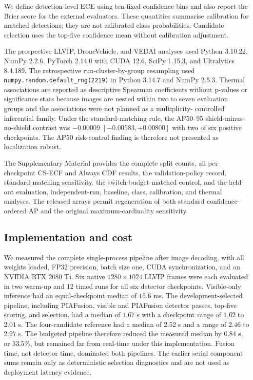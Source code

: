 \documentclass[preprint,11pt]{elsarticle}
\begin{document}
We define detection-level ECE using ten fixed confidence bins and also report
the Brier score for the external evaluators. These quantities summarise
calibration for matched detections; they are not calibrated class
probabilities. Candidate selection uses the top-five confidence mean without
calibration adjustment.

The prospective LLVIP, DroneVehicle, and VEDAI analyses used Python 3.10.22,
NumPy 2.2.6, PyTorch
2.14.0 with CUDA 12.6, SciPy 1.15.3, and Ultralytics 8.4.189. The retrospective
run-cluster-by-group resampling used
\texttt{numpy.random.default\_rng(2219)} in Python 3.14.7 and NumPy 2.5.3.
Thermal associations are reported as descriptive Spearman coefficients without
p-values or significance stars because images are nested within two to seven
evaluation groups and the associations were not planned as a multiplicity-
controlled inferential family.
Under the standard-matching rule, the AP50--95 shield-minus-no-shield contrast
was \(-0.00009\) \([-0.00583,+0.00800]\) with two of six positive checkpoints.
The AP50 risk-control finding is therefore not presented as localization
robust.

The Supplementary Material provides the complete split counts, all
per-checkpoint CS-ECF and Always CDF results, the validation-policy record,
standard-matching sensitivity, the switch-budget-matched control, and the
held-out evaluation, independent-run, baseline, class, calibration, and
thermal analyses. The released arrays permit regeneration of both standard
confidence-ordered AP and the original maximum-cardinality sensitivity.

\subsection{Implementation and cost}

We measured the complete single-process pipeline after image decoding, with
all weights loaded, FP32 precision, batch size one, CUDA synchronization, and
an NVIDIA RTX 2080 Ti. Six native \(1280\times1024\) LLVIP frames were each
evaluated in two warm-up and 12 timed runs for all six detector checkpoints.
Visible-only inference had an equal-checkpoint median of \(15.6\) ms. The
development-selected pipeline, including PIAFusion, visible and PIAFusion
detector passes, top-five scoring, and selection, had a median of \(1.67\) s
with a checkpoint range of \(1.62\) to \(2.01\) s. The four-candidate
reference had a median of \(2.52\) s and a range of \(2.46\) to \(2.97\) s.
The budgeted pipeline therefore reduced the measured median by \(0.84\) s, or
\(33.5\%\), but remained far from real-time under this implementation.
Fusion time, not detector time, dominated both pipelines. The earlier
serial component sums remain only as deterministic selection diagnostics and
are not used as deployment latency evidence.
\end{document}
